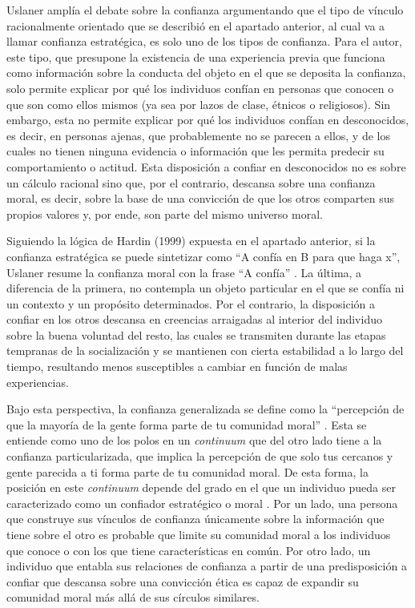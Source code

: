 \documentclass[12pt,twoside]{templates/facsothesis}
\begin{document}
Uslaner \citetext{\citeyear{uslanerMoralFoundationsTrust2002}; \citeyear{uslanerStudyTrust2017}} amplía el debate sobre la confianza argumentando que el tipo de vínculo racionalmente orientado que se describió en el apartado anterior, al cual va a llamar confianza estratégica, es solo uno de los tipos de confianza. Para el autor, este tipo, que presupone la existencia de una experiencia previa que funciona como información sobre la conducta del objeto en el que se deposita la confianza, solo permite explicar por qué los individuos confían en personas que conocen o que son como ellos mismos (ya sea por lazos de clase, étnicos o religiosos). Sin embargo, esta no permite explicar por qué los individuos confían en desconocidos, es decir, en personas ajenas, que probablemente no se parecen a ellos, y de los cuales no tienen ninguna evidencia o información que les permita predecir su comportamiento o actitud. Esta disposición a confiar en desconocidos no es sobre un cálculo racional sino que, por el contrario, descansa sobre una confianza moral, es decir, sobre la base de una convicción de que los otros comparten sus propios valores y, por ende, son parte del mismo universo moral.

Siguiendo la lógica de Hardin (1999) expuesta en el apartado anterior, si la confianza estratégica se puede sintetizar como ``A confía en B para que haga x'', Uslaner resume la confianza moral con la frase ``A confía'' \citep[p.~21]{uslanerMoralFoundationsTrust2002}. La última, a diferencia de la primera, no contempla un objeto particular en el que se confía ni un contexto y un propósito determinados. Por el contrario, la disposición a confiar en los otros descansa en creencias arraigadas al interior del individuo sobre la buena voluntad del resto, las cuales se transmiten durante las etapas tempranas de la socialización y se mantienen con cierta estabilidad a lo largo del tiempo, resultando menos susceptibles a cambiar en función de malas experiencias.

Bajo esta perspectiva, la confianza generalizada se define como la ``percepción de que la mayoría de la gente forma parte de tu comunidad moral'' \citep[p.~26]{uslanerMoralFoundationsTrust2002}. Esta se entiende como uno de los polos en un \emph{continuum} que del otro lado tiene a la confianza particularizada, que implica la percepción de que solo tus cercanos y gente parecida a ti forma parte de tu comunidad moral. De esta forma, la posición en este \emph{continuum} depende del grado en el que un individuo pueda ser caracterizado como un confiador estratégico o moral \citep{oskarssonGeneralizedTrustPolitical2010}. Por un lado, una persona que construye sus vínculos de confianza únicamente sobre la información que tiene sobre el otro es probable que limite su comunidad moral a los individuos que conoce o con los que tiene características en común. Por otro lado, un individuo que entabla sus relaciones de confianza a partir de una predisposición a confiar que descansa sobre una convicción ética es capaz de expandir su comunidad moral más allá de sus círculos similares.
\end{document}
